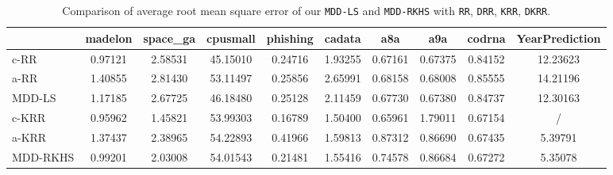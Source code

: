 \documentclass{article}
\begin{document}
\begin{table*}[t]
\small
\footnotesize
   \caption{
    \small Comparison of average root mean square error of our \texttt{MDD-LS} and \texttt{MDD-RKHS} with
    \texttt{RR}, \texttt{DRR}, \texttt{KRR}, \texttt{DKRR}.
   }
   \label{tabel:mse}
    \begin{tabular*}{\linewidth}{@{\extracolsep{-0.25cm}}lccccccccc}
    \toprule
                                &madelon                    &space\_ga                   &cpusmall              &phishing           &cadata             &a8a                    &a9a                &cod\-rna            &YearPrediction                 \\   \hline
c-RR                            &0.97121                    &2.58531                     &45.15010              &0.24716            &1.93255            &0.67161                &0.67375            &0.84152             &12.23623 \\
a-RR                            &1.40855                    &2.81430                     &53.11497              &0.25856            &2.65991            &0.68158                &0.68008            &0.85555             &14.21196 \\
MDD-LS                          &1.17185                    &2.67725                     &46.18480              &0.25128            &2.11459            &0.67730                &0.67380            &0.84737             &12.30163\\
\hline \hline
c-KRR                           &0.95962                    &1.45821                     &53.99303              &0.16789            &1.50400            &0.65961                &1.79011            &0.67154             &/ \\
a-KRR                           &1.37437                    &2.38965                     &54.22893              &0.41966            &1.59813            &0.87312                &0.86690            &0.67435             &5.39791\\
MDD-RKHS                        &0.99201                    &2.03008                     &54.01543              &0.21481            &1.55416            &0.74578                &0.86684            &0.67272             &5.35078\\
   \bottomrule
\end{tabular*}
\end{table*}
\end{document}
